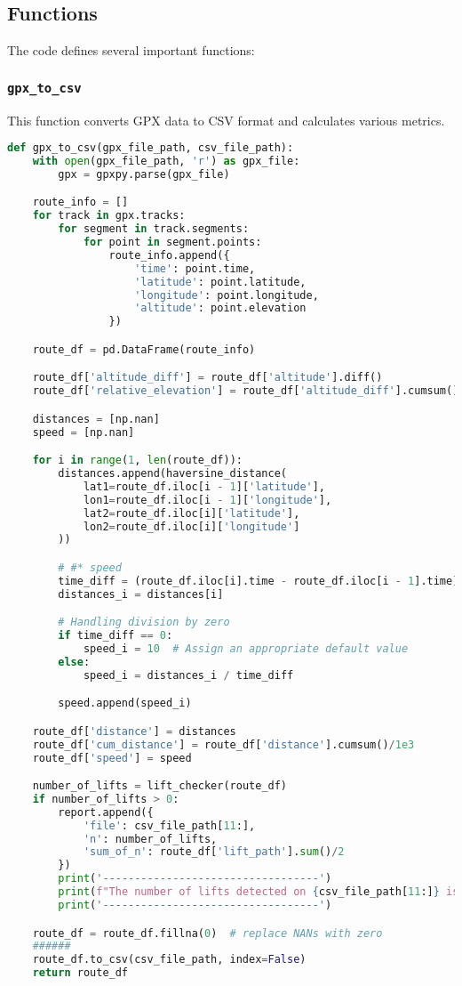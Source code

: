 \subsection{Functions}

The code defines several important functions:

\subsubsection{\texttt{gpx\_to\_csv}}

This function converts GPX data to CSV format and calculates various metrics.

\begin{lstlisting}[language=Python]
def gpx_to_csv(gpx_file_path, csv_file_path):
    with open(gpx_file_path, 'r') as gpx_file:
        gpx = gpxpy.parse(gpx_file)

    route_info = []
    for track in gpx.tracks:
        for segment in track.segments:
            for point in segment.points:
                route_info.append({
                    'time': point.time,
                    'latitude': point.latitude,
                    'longitude': point.longitude,
                    'altitude': point.elevation
                })

    route_df = pd.DataFrame(route_info)

    route_df['altitude_diff'] = route_df['altitude'].diff()
    route_df['relative_elevation'] = route_df['altitude_diff'].cumsum()

    distances = [np.nan]
    speed = [np.nan]

    for i in range(1, len(route_df)):
        distances.append(haversine_distance(
            lat1=route_df.iloc[i - 1]['latitude'],
            lon1=route_df.iloc[i - 1]['longitude'],
            lat2=route_df.iloc[i]['latitude'],
            lon2=route_df.iloc[i]['longitude']
        ))

        # #* speed
        time_diff = (route_df.iloc[i].time - route_df.iloc[i - 1].time).seconds
        distances_i = distances[i]

        # Handling division by zero
        if time_diff == 0:
            speed_i = 10  # Assign an appropriate default value
        else:
            speed_i = distances_i / time_diff

        speed.append(speed_i)

    route_df['distance'] = distances
    route_df['cum_distance'] = route_df['distance'].cumsum()/1e3
    route_df['speed'] = speed

    number_of_lifts = lift_checker(route_df)
    if number_of_lifts > 0:
        report.append({
            'file': csv_file_path[11:],
            'n': number_of_lifts,
            'sum_of_n': route_df['lift_path'].sum()/2
        })
        print('----------------------------------')
        print(f"The number of lifts detected on {csv_file_path[11:]} is {number_of_lifts}")
        print('----------------------------------')

    route_df = route_df.fillna(0)  # replace NANs with zero
    ######
    route_df.to_csv(csv_file_path, index=False)
    return route_df
\end{lstlisting}

